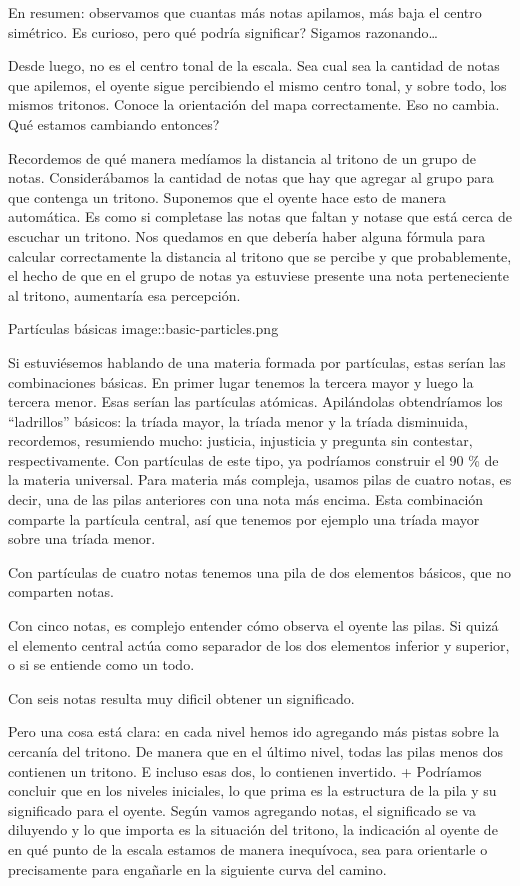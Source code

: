 \documentclass[]{article}
\begin{document}
En resumen: observamos que cuantas más notas apilamos, más baja el centro simétrico. Es curioso, pero qué podría significar? Sigamos razonando\ldots{}

Desde luego, no es el centro tonal de la escala. Sea cual sea la cantidad de notas que apilemos, el oyente sigue percibiendo el mismo centro tonal, y sobre todo, los mismos tritonos. Conoce la orientación del mapa correctamente. Eso no cambia. Qué estamos cambiando entonces?

Recordemos de qué manera medíamos la distancia al tritono de un grupo de notas. Considerábamos la cantidad de notas que hay que agregar al grupo para que contenga un tritono. Suponemos que el oyente hace esto de manera automática. Es como si completase las notas que faltan y notase que está cerca de escuchar un tritono. Nos quedamos en que debería haber alguna fórmula para calcular correctamente la distancia al tritono que se percibe y que probablemente, el hecho de que en el grupo de notas ya estuviese presente una nota perteneciente al tritono, aumentaría esa percepción.

Partículas básicas image::basic-particles.png

Si estuviésemos hablando de una materia formada por partículas, estas serían las combinaciones básicas. En primer lugar tenemos la tercera mayor y luego la tercera menor. Esas serían las partículas atómicas. Apilándolas obtendríamos los ``ladrillos'' básicos: la tríada mayor, la tríada menor y la tríada disminuida, recordemos, resumiendo mucho: justicia, injusticia y pregunta sin contestar, respectivamente. Con partículas de este tipo, ya podríamos construir el 90 \% de la materia universal. Para materia más compleja, usamos pilas de cuatro notas, es decir, una de las pilas anteriores con una nota más encima. Esta combinación comparte la partícula central, así que tenemos por ejemplo una tríada mayor sobre una tríada menor.

Con partículas de cuatro notas tenemos una pila de dos elementos básicos, que no comparten notas.

 Con cinco notas, es complejo entender cómo observa el oyente las pilas. Si quizá el elemento central actúa como separador de los dos elementos inferior y superior, o si se entiende como un todo.

Con seis notas resulta muy dificil obtener un significado.

Pero una cosa está clara: en cada nivel hemos ido agregando más pistas sobre la cercanía del tritono. De manera que en el último nivel, todas las pilas menos dos contienen un tritono. E incluso esas dos, lo contienen invertido. + Podríamos concluir que en los niveles iniciales, lo que prima es la estructura de la pila y su significado para el oyente. Según vamos agregando notas, el significado se va diluyendo y lo que importa es la situación del tritono, la indicación al oyente de en qué punto de la escala estamos de manera inequívoca, sea para orientarle o precisamente para engañarle en la siguiente curva del camino.
\end{document}
